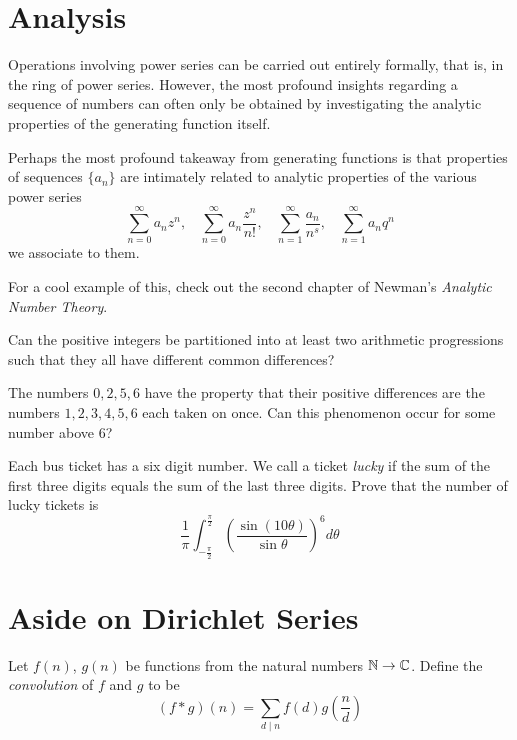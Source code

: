 \documentclass{article}
\begin{document}
\section{Analysis}
Operations involving power series can be carried out entirely formally, that is, in the ring of power series. However, the most profound insights regarding a sequence of numbers can often only be obtained by investigating the analytic properties of the generating function itself.

Perhaps the most profound takeaway from generating functions is that properties of sequences $\{a_n\}$ are intimately related to analytic properties of the various power series 
\[\sum_{n=0}^\infty a_nz^n,\ \ \ \ \sum_{n=0}^\infty a_n\frac{z^n}{n!},\ \ \ \ \sum_{n=1}^\infty \frac{a_n}{n^s},\ \ \ \ \sum_{n=1}^\infty a_nq^n\] we associate to them. 

For a cool example of this, check out the second chapter of Newman's \emph{Analytic Number Theory}.
\begin{exercise}
Can the positive integers be partitioned into at least two arithmetic progressions such that they all have different common differences?
\end{exercise}
\begin{exercise}
The numbers $0,2,5,6$ have the property that their positive differences are the numbers $1,2,3,4,5,6$ each taken on once. Can this phenomenon occur for some number above $6$?
\end{exercise}
\begin{exercise}
Each bus ticket has a six digit number. We call a ticket \emph{lucky} if the sum of the first three digits equals the sum of the last three digits. Prove that the number of lucky tickets is 
\[\frac{1}{\pi}\int_{-\frac{\pi}{2}}^{\frac{\pi}{2}}\left(\frac{\sin(10\theta)}{\sin\theta}\right)^6d\theta\]
\end{exercise}

\section{Aside on Dirichlet Series}
Let $f(n)$, $g(n)$ be functions from the natural numbers $\mathbb{N}\to \mathbb{C}$. Define the \emph{convolution} of $f$ and $g$ to be 
\[(f*g)(n) = \sum_{d\mid n} f(d)g\left(\frac{n}{d}\right)\] 
\end{document}
